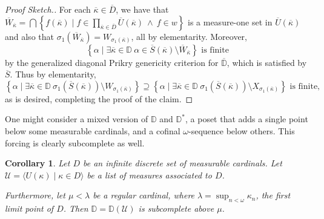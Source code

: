 \documentclass{amsart}
\newtheorem{corollary}[theorem]{Corollary}
\theoremstyle{definition}
\theoremstyle{remark}
\newcommand{\D}{\mathbb{D}}
\renewcommand{\S}{{\overline{S}}}
\newcommand{\U}{\mathcal{U}}
\newcommand{\st}{\; | \;}
\newcommand{\set}[2]{\left\{#1\st #2 \right\}}
\newcommand{\seq}[2]{\langle #1 \st #2 \rangle}
\begin{document}
\begin{proof}[Proof Sketch.]
For each $\overline \kappa \in \overline D$, we have that $\overline W_{\overline \kappa} = \bigcap \set{f(\overline \kappa) }{ f \in \prod_{\overline \kappa \in \overline D} \overline U(\overline \kappa) \ \land \ f \in w }$ is a measure-one set in $\overline U(\overline \kappa)$ and also that $\sigma_1(\overline W_{\overline \kappa}) = W_{\sigma_1(\overline \kappa)}$, all by elementarity. Moreover, 
$$\set{ \alpha }{ \exists \overline \kappa \in \D \ \alpha \in \overline S(\overline \kappa) \setminus \overline W_{\overline \kappa} } \text{ is finite}$$ by the generalized diagonal Prikry genericity criterion for $\overline{\D}$, which is satisfied by $\overline S$.
Thus by elementarity,
$$\set{ \alpha }{ \exists \overline \kappa \in \D \ \sigma_1(\S(\overline \kappa)) \setminus W_{\sigma_1(\overline \kappa)} } \supseteq \set{ \alpha }{ \exists \overline \kappa \in \D \ \sigma_1(\S(\overline \kappa)) \setminus X_{\sigma_1(\overline \kappa)}} \text{ is finite,}$$
as is desired, completing the proof of the claim. 
\end{proof}

One might consider a mixed version of $\D$ and $\D^*$, a poset that adds a single point below some measurable cardinals, and a cofinal $\omega$-sequence below others. This forcing is clearly subcomplete as well.
%

\begin{corollary} Let $D$ be an infinite discrete set of measurable cardinals. Let $\U = \seq{ U(\kappa) }{ \kappa \in D }$ be a list of measures associated to $D$. 

Furthermore, let $\mu < \lambda$ be a regular cardinal, where $\lambda = \sup_{n<\omega} \kappa_n$, the first limit point of $D$.
Then $\D=\D(\U)$ is subcomplete above $\mu$. \end{corollary}
\end{document}
